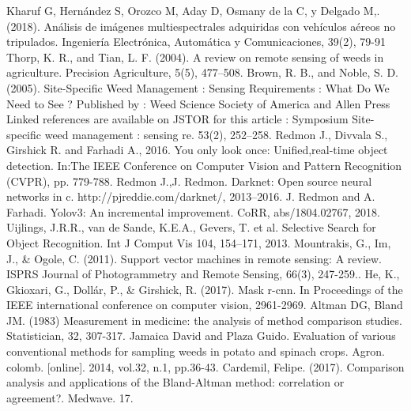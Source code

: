 \documentclass[journal,article,submit,moreauthors,pdftex]{Definitions/mdpi}
\begin{document}
\begin{thebibliography}{999}
Kharuf G, Hernández S, Orozco M, Aday D, Osmany de la C, y Delgado M,. (2018). Análisis de imágenes multiespectrales adquiridas con vehículos aéreos no tripulados. Ingeniería Electrónica, Automática y Comunicaciones, 39(2), 79-91
Thorp, K. R., and Tian, L. F. (2004). A review on remote sensing of weeds in agriculture. Precision Agriculture, 5(5), 477–508.
 Brown, R. B., and Noble, S. D. (2005). Site-Specific Weed Management : Sensing Requirements : What Do We Need to See ? Published by : Weed Science Society of America and Allen Press Linked references are available on JSTOR for this article : Symposium Site-specific weed management : sensing re. 53(2), 252–258.
Redmon J., Divvala S., Girshick R. and Farhadi A., 2016. You only look once: Unified,real-time object detection. In:The IEEE Conference on Computer Vision and Pattern Recognition (CVPR), pp. 779-788.
 Redmon J.,J. Redmon. Darknet: Open source neural networks in c. http://pjreddie.com/darknet/, 2013–2016.
  J. Redmon and A. Farhadi. Yolov3: An incremental improvement. CoRR, abs/1804.02767, 2018.
  Uijlings, J.R.R., van de Sande, K.E.A., Gevers, T. et al. Selective Search for Object Recognition. Int J Comput Vis 104, 154–171, 2013.
 Mountrakis, G., Im, J., & Ogole, C. (2011). Support vector machines in remote sensing: A review. ISPRS Journal of Photogrammetry and Remote Sensing, 66(3), 247-259..
He, K., Gkioxari, G., Dollár, P., & Girshick, R. (2017). Mask r-cnn. In Proceedings of the IEEE international conference on computer vision, 2961-2969.
Altman DG, Bland JM. (1983) Measurement in medicine: the analysis of method comparison studies. Statistician, 32, 307-317.
Jamaica David and Plaza Guido. Evaluation of various conventional methods for sampling weeds in potato and spinach crops. Agron. colomb. [online]. 2014, vol.32, n.1, pp.36-43. 
 Cardemil, Felipe. (2017). Comparison analysis and applications of the Bland-Altman method: correlation or agreement?. Medwave. 17.
\end{thebibliography}

\end{document}
